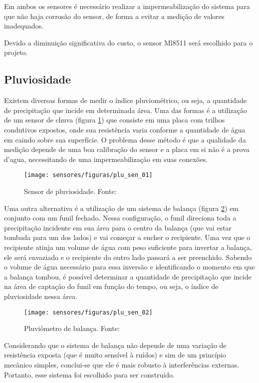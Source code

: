 	Em ambos os sensores é necessário realizar a impermeabilização do sistema para que não haja corrosão do sensor, de forma a evitar a medição de valores inadequados. 
	
	Devido a diminuição significativa do custo, o sensor Ml8511 será escolhido para o projeto.

	\subsection{Pluviosidade}

	Existem diversas formas de medir o índice pluviométrico, ou seja, a quantidade de precipitação que incide em determinada área. Uma das formas é a utilização de um sensor de chuva (figura \ref{plu_sen_01}) que consiste em uma placa com trilhos condutivos expostos, onde sua resistência varia conforme a quantidade de água em caindo sobre sua superfície. O problema desse método é que a qualidade da medição depende de uma boa calibração do sensor e a placa em si não é a prova d'agua, necessitando de uma impermeabilização em suas conexões.
	
	\begin{figure}[H]
		\centering
		\texttt{[image: sensores/figuras/plu\_sen\_01]}
		\caption{Sensor de pluviosidade. Fonte: \cite{bib_plu_sen_01}}
		\label{plu_sen_01}
	\end{figure}
	
	Uma outra alternativa é a utilização de um sistema de balança (figura \ref{plu_sen_02}) em conjunto com um funil fechado. Nessa configuração, o funil direciona toda a precipitação incidente em sua área para o centro da balança (que vai estar tombada para um dos lados) e vai começar a encher o recipiente. Uma vez que o recipiente atinja um volume de água com peso suficiente para invertar a balança, ele será envaziado e o recipiente do outro lado passará a ser preenchido. Sabendo o volume de água necessário para essa inversão e identificando o momento em que a balança tombou, é possível determinar a quantidade de precipitação que incide na área de captação do funil em função do tempo, ou seja, o índice de pluviosidade nessa área.

	\begin{figure}[H]
		\centering
		\texttt{[image: sensores/figuras/plu\_sen\_02]}
		\caption{Pluviômetro de balança. Fonte: \cite{bib_plu_sen_02}}
		\label{plu_sen_02}
	\end{figure}

	Considerando que o sistema de balança não depende de uma variação de resistência exposta (que é muito sensível à ruídos) e sim de um princípio mecânico simples, conclui-se que ele é mais robusto à interferências externas. Portanto, esse sistema foi escolhido para ser construído.
	
